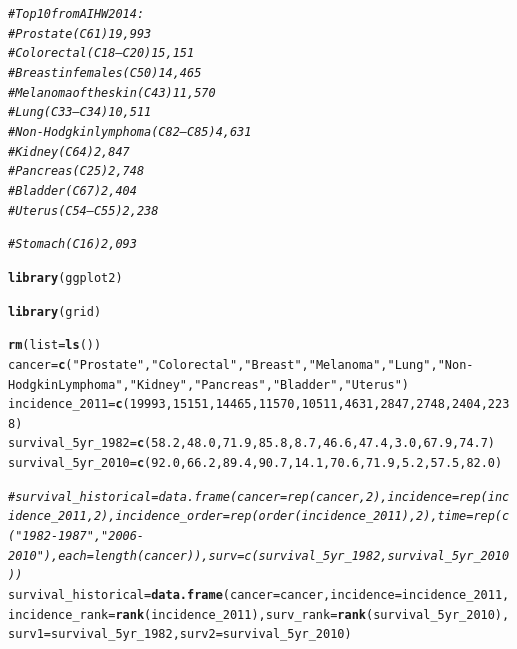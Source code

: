 \documentclass{article}\usepackage[]{graphicx}\usepackage[]{color}
\makeatletter
\newcommand{\hlnum}[1]{\textcolor[rgb]{0.686,0.059,0.569}{#1}}%
\newcommand{\hlstr}[1]{\textcolor[rgb]{0.192,0.494,0.8}{#1}}%
\newcommand{\hlcom}[1]{\textcolor[rgb]{0.678,0.584,0.686}{\textit{#1}}}%
\newcommand{\hlstd}[1]{\textcolor[rgb]{0.345,0.345,0.345}{#1}}%
\newcommand{\hlkwb}[1]{\textcolor[rgb]{0.69,0.353,0.396}{#1}}%
\newcommand{\hlkwc}[1]{\textcolor[rgb]{0.333,0.667,0.333}{#1}}%
\newcommand{\hlkwd}[1]{\textcolor[rgb]{0.737,0.353,0.396}{\textbf{#1}}}%
\newenvironment{kframe}{%
 \def\at@end@of@kframe{}%
 \ifinner\ifhmode%
  \def\at@end@of@kframe{\end{minipage}}%
  \begin{minipage}{\columnwidth}%
 \fi\fi%
 \def\FrameCommand##1{\hskip\@totalleftmargin \hskip-\fboxsep
 \colorbox{shadecolor}{##1}\hskip-\fboxsep
     \hskip-\linewidth \hskip-\@totalleftmargin \hskip\columnwidth}%
 \MakeFramed {\advance\hsize-\width
   \@totalleftmargin\z@ \linewidth\hsize
   \@setminipage}}%
 {\par\unskip\endMakeFramed%
 \at@end@of@kframe}
\newenvironment{knitrout}{}{} %
\makeatother
\begin{document}
\begin{knitrout}
\color{fgcolor}\begin{kframe}
\begin{alltt}
\hlcom{# Top 10 from AIHW2014:}
\hlcom{# Prostate (C61) 19,993}
\hlcom{# Colorectal (C18–C20) 15,151}
\hlcom{# Breast in females (C50) 14,465}
\hlcom{# Melanoma of the skin (C43) 11,570}
\hlcom{# Lung (C33–C34) 10,511}
\hlcom{# Non-Hodgkin lymphoma (C82–C85) 4,631}
\hlcom{# Kidney (C64) 2,847}
\hlcom{# Pancreas (C25) 2,748}
\hlcom{# Bladder (C67) 2,404}
\hlcom{# Uterus (C54–C55) 2,238}

\hlcom{# Stomach (C16) 2,093}

\hlkwd{library}\hlstd{(ggplot2)}
\end{alltt}


{\ttfamily\noindent\itshape\color{messagecolor}{\#\# Loading required package: methods}}\begin{alltt}
\hlkwd{library}\hlstd{(grid)}

\hlkwd{rm}\hlstd{(}\hlkwc{list} \hlstd{=} \hlkwd{ls}\hlstd{())}
\hlstd{cancer} \hlkwb{=}            \hlkwd{c}\hlstd{(}\hlstr{"Prostate"}\hlstd{,} \hlstr{"Colorectal"}\hlstd{,} \hlstr{"Breast"}\hlstd{,} \hlstr{"Melanoma"}\hlstd{,} \hlstr{"Lung"}\hlstd{,} \hlstr{"Non-Hodgkin Lymphoma"}\hlstd{,} \hlstr{"Kidney"}\hlstd{,}  \hlstr{"Pancreas"}\hlstd{,} \hlstr{"Bladder"}\hlstd{,} \hlstr{"Uterus"}\hlstd{)}
\hlstd{incidence_2011} \hlkwb{=}    \hlkwd{c}\hlstd{(}\hlnum{19993}\hlstd{,}      \hlnum{15151}\hlstd{,}        \hlnum{14465}\hlstd{,}    \hlnum{11570}\hlstd{,}      \hlnum{10511}\hlstd{,}  \hlnum{4631}\hlstd{,}                   \hlnum{2847}\hlstd{,}      \hlnum{2748}\hlstd{,}       \hlnum{2404}\hlstd{,}      \hlnum{2238}\hlstd{)}
\hlstd{survival_5yr_1982} \hlkwb{=} \hlkwd{c}\hlstd{(}\hlnum{58.2}\hlstd{,}       \hlnum{48.0}\hlstd{,}         \hlnum{71.9}\hlstd{,}     \hlnum{85.8}\hlstd{,}       \hlnum{8.7}\hlstd{,}    \hlnum{46.6}\hlstd{,}                   \hlnum{47.4}\hlstd{,}      \hlnum{3.0}\hlstd{,}        \hlnum{67.9}\hlstd{,}      \hlnum{74.7}\hlstd{)}
\hlstd{survival_5yr_2010} \hlkwb{=} \hlkwd{c}\hlstd{(}\hlnum{92.0}\hlstd{,}       \hlnum{66.2}\hlstd{,}         \hlnum{89.4}\hlstd{,}     \hlnum{90.7}\hlstd{,}       \hlnum{14.1}\hlstd{,}   \hlnum{70.6}\hlstd{,}                   \hlnum{71.9}\hlstd{,}      \hlnum{5.2}\hlstd{,}        \hlnum{57.5}\hlstd{,}      \hlnum{82.0}\hlstd{)}

\hlcom{# survival_historical = data.frame(cancer = rep(cancer, 2), incidence = rep(incidence_2011, 2), incidence_order = rep(order(incidence_2011), 2), time = rep(c("1982-1987", "2006-2010"), each = length(cancer)), surv = c(survival_5yr_1982, survival_5yr_2010))}
\hlstd{survival_historical} \hlkwb{=} \hlkwd{data.frame}\hlstd{(}\hlkwc{cancer} \hlstd{= cancer,} \hlkwc{incidence} \hlstd{= incidence_2011,} \hlkwc{incidence_rank} \hlstd{=} \hlkwd{rank}\hlstd{(incidence_2011),} \hlkwc{surv_rank} \hlstd{=} \hlkwd{rank}\hlstd{(survival_5yr_2010),} \hlkwc{surv1} \hlstd{= survival_5yr_1982,} \hlkwc{surv2} \hlstd{= survival_5yr_2010)}


\end{alltt}
\end{kframe}
\end{knitrout}
\end{document}
